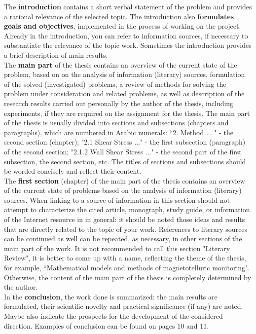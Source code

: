 \documentclass[a4paper, 12pt]{article}
\begin{document}
The \textbf{introduction} contains a short verbal statement of the problem and 
provides a rational relevance of the selected topic. The introduction 
also \textbf{formulates goals and objectives}, implemented in the process of working
on the project. Already in the introduction, you can refer to information 
sources, if necessary to substantiate the relevance of the topic work. 
Sometimes the introduction provides a brief description of main results.\\

The \textbf{main part} of the thesis contains an overview of the current state of 
the problem, based on on the analysis of information (literary) sources, 
formulation of the solved (investigated) problems, a review of methods for 
solving the problem under consideration and related problems, as well as 
description of the research results carried out personally by the author of the
thesis, including experiments, if they are required on the assignment for the 
thesis. The main part of the thesis is usually divided into sections and 
subsections (chapters and paragraphs), which are numbered in Arabic numerals: 
“2. Method ... " - the second section (chapter); "2.1 Shear Stress ..." - 
the first subsection (paragraph) of the second section; "2.1.2 Wall Shear 
Stress ..." - the second part of the first subsection, the second section, 
etc. The titles of sections and subsections should be worded concisely and
reflect their content.\\

The \textbf{first section} (chapter) of the main part of the thesis contains an 
overview of the current state of problems based on the analysis of 
information (literary) sources. When linking to a source of information in 
this section should not attempt to characterize the cited article, monograph, 
study guide, or information of the Internet resource in in general: it should 
be noted those ideas and results that are directly related to the topic of your
work. References to literary sources can be continued as well can be repeated,
as necessary, in other sections of the main part of the work. It is not 
recommended to call this section "Literary Review", it is better to come up 
with a name, reflecting the theme of the thesis, for example, “Mathematical 
models and methods of magnetotelluric monitoring". Otherwise, the content of 
the main part of the thesis is completely determined by the author.\\

In the \textbf{conclusion}, the work done is summarized: the main results are 
formulated, their scientific novelty and practical significance (if any) are 
noted. Maybe also indicate the prospects for the development of the considered
direction. Examples of conclusion can be found on pages 10 and 11.\\
\end{document}
